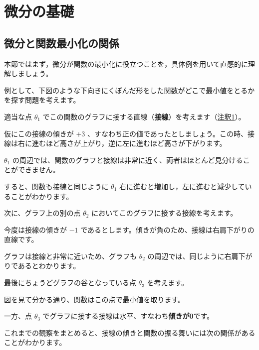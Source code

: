 \chapter{微分の基礎}


\section{微分と関数最小化の関係}


本節ではまず，微分が関数の最小化に役立つことを，具体例を用いて直感的に理解しましょう。

例として、下図のような下向きにくぼんだ形をした関数がどこで最小値をとるかを探す問題を考えます。





適当な点 $\theta_{1}$ でこの関数のグラフに接する直線（\textbf{接線}）を考えます（\hyperref[04-basics-of-differential-note1]{注釈1}）。

仮にこの接線の傾きが $+3$ 、すなわち正の値であったとしましょう。この時、接線は右に進むほど高さが上がり，逆に左に進むほど高さが下がります。

$\theta_{1}$ の周辺では、関数のグラフと接線は非常に近く、両者はほとんど見分けることができません。

すると、関数も接線と同じように $\theta_{1}$ 右に進むと増加し，左に進むと減少していることがわかります。




次に、グラフ上の別の点 $\theta_{2}$ においてこのグラフに接する接線を考えます。

今度は接線の傾きが $-1$ であるとします。傾きが負のため、接線は右肩下がりの直線です。

グラフは接線と非常に近いため、グラフも $\theta_{2}$ の周辺では、同じように右肩下がりであるとわかります。




最後にちょうどグラフの谷となっている点 $\theta_{3}$ を考えます。

図を見て分かる通り、関数はこの点で最小値を取ります。

一方、点 $\theta_{3}$ でグラフに接する接線は水平、すなわち\textbf{傾きが0}です。


これまでの観察をまとめると、接線の傾きと関数の振る舞いには次の関係があることがわかります。


